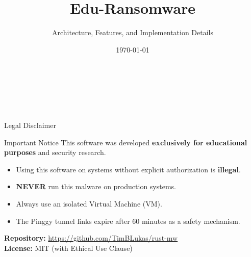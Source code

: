 \documentclass[aspectratio=169]{beamer}
\title{Edu-Ransomware}
\subtitle{Architecture, Features, and Implementation Details}
\date{\today}
\institute{IT Security -- Educational Ransomware Simulation Project}
\begin{document}
{
\begin{frame}[plain]
  \vspace{2cm}
  \begin{center}
    {\inserttitle}\\[0.8em]
    {\insertsubtitle}\\[1.5em]
    {\footnotesize{}\insertinstitute}\\[0.3em]
    {\footnotesize{}\insertdate}
  \end{center}
\end{frame}
}

\begin{frame}{Legal Disclaimer}
  \begin{dangerbox}{Important Notice}
    This software was developed \textbf{exclusively for educational purposes} and security research.

    \vspace{0.3em}
    \begin{itemize}
      \item Using this software on systems without explicit authorization is \textbf{illegal}.
      \item \textbf{NEVER} run this malware on production systems.
      \item Always use an isolated Virtual Machine (VM).
      \item The Pinggy tunnel links expire after 60 minutes as a safety mechanism.
    \end{itemize}
  \end{dangerbox}

  \vspace{0.5em}
  \begin{center}
    \textbf{Repository:} \url{https://github.com/TimBLukas/rust-mw}\\[0.3em]
    \textbf{License:} MIT (with Ethical Use Clause)
  \end{center}
\end{frame}
\end{document}
